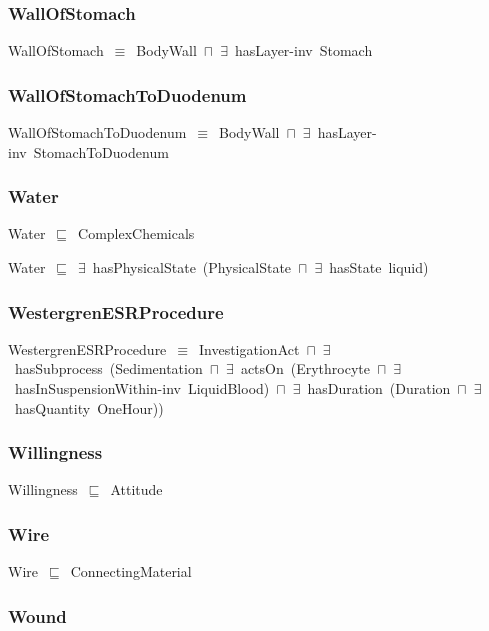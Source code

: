 \documentclass{article}
\begin{document}
\subsubsection*{WallOfStomach}

WallOfStomach~\ensuremath{\equiv}~BodyWall~\ensuremath{\sqcap}~\ensuremath{\exists}~hasLayer-inv~Stomach

\subsubsection*{WallOfStomachToDuodenum}

WallOfStomachToDuodenum~\ensuremath{\equiv}~BodyWall~\ensuremath{\sqcap}~\ensuremath{\exists}~hasLayer-inv~StomachToDuodenum

\subsubsection*{Water}

Water~\ensuremath{\sqsubseteq}~ComplexChemicals~

Water~\ensuremath{\sqsubseteq}~\ensuremath{\exists}~hasPhysicalState~(PhysicalState~\ensuremath{\sqcap}~\ensuremath{\exists}~hasState~liquid)~

\subsubsection*{WestergrenESRProcedure}

WestergrenESRProcedure~\ensuremath{\equiv}~InvestigationAct~\ensuremath{\sqcap}~\ensuremath{\exists}~hasSubprocess~(Sedimentation~\ensuremath{\sqcap}~\ensuremath{\exists}~actsOn~(Erythrocyte~\ensuremath{\sqcap}~\ensuremath{\exists}~hasInSuspensionWithin-inv~LiquidBlood)~\ensuremath{\sqcap}~\ensuremath{\exists}~hasDuration~(Duration~\ensuremath{\sqcap}~\ensuremath{\exists}~hasQuantity~OneHour))

\subsubsection*{Willingness}

Willingness~\ensuremath{\sqsubseteq}~Attitude~

\subsubsection*{Wire}

Wire~\ensuremath{\sqsubseteq}~ConnectingMaterial~

\subsubsection*{Wound}
\end{document}
